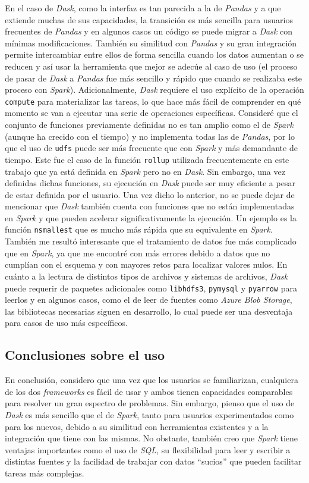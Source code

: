 En el caso de \textit{Dask}, como la interfaz es tan parecida a la de \textit{Pandas} y a que extiende muchas de sus capacidades, la transición es más sencilla para usuarios frecuentes de \textit{Pandas} y en algunos casos un código se puede migrar a \textit{Dask} con mínimas modificaciones. También su similitud con \textit{Pandas} y su gran integración permite intercambiar entre ellos de forma sencilla cuando los datos aumentan o se reducen y así usar la herramienta que mejor se adecúe al caso de uso (el proceso de pasar de \textit{Dask} a \textit{Pandas} fue más sencillo y rápido que cuando se realizaba este proceso con \textit{Spark}). Adicionalmente, \textit{Dask} requiere el uso explícito de la operación \texttt{compute} para materializar las tareas, lo que hace más fácil de comprender en qué momento se van a ejecutar una serie de operaciones específicas.
Consideré que el conjunto de funciones previamente definidas no es tan amplio como el de \textit{Spark} (aunque ha crecido con el tiempo) y no implementa todas las de \textit{Pandas}, por lo que el uso de \texttt{udfs} puede ser más frecuente que con \textit{Spark} y más demandante de tiempo. Este fue el caso de la función \texttt{rollup} utilizada frecuentemente en este trabajo que ya está definida en \textit{Spark} pero no en \textit{Dask}. Sin embargo, una vez definidas dichas funciones, su ejecución en \textit{Dask} puede ser muy eficiente a pesar de estar definida por el usuario. Una vez dicho lo anterior, no se puede dejar de mencionar que \textit{Dask} también cuenta con funciones que no están implementadas en \textit{Spark} y que pueden acelerar significativamente la ejecución. Un ejemplo es la función \texttt{nsmallest} que es mucho más rápida que su equivalente en \textit{Spark}. También me resultó interesante que el tratamiento de datos fue más complicado que en \textit{Spark}, ya que me encontré con más errores debido a datos que no cumplían con el esquema y con mayores retos para localizar valores nulos.
En cuánto a la lectura de distintos tipos de archivos y sistemas de archivos, \textit{Dask} puede requerir de paquetes adicionales como \texttt{libhdfs3}, \texttt{pymysql} y \texttt{pyarrow} para leerlos y en algunos casos, como el de leer de fuentes como \textit{Azure Blob Storage}, las bibliotecas necesarias siguen en desarrollo, lo cual puede ser una desventaja para casos de uso más específicos.

\subsection{Conclusiones sobre el uso}
En conclusión, considero que una vez que los usuarios se familiarizan, cualquiera de los dos \textit{frameworks} es fácil de usar y ambos tienen capacidades comparables para resolver un gran espectro de problemas. Sin embargo, pienso que el uso de \textit{Dask} es más sencillo que el de \textit{Spark}, tanto para usuarios experimentados como para los nuevos, debido a su similitud con herramientas existentes y a la integración que tiene con las mismas. No obstante, también creo que \textit{Spark} tiene ventajas importantes como el uso de \textit{SQL}, su flexibilidad para leer y escribir a distintas fuentes y la facilidad de trabajar con datos ``sucios'' que pueden facilitar tareas más complejas.

